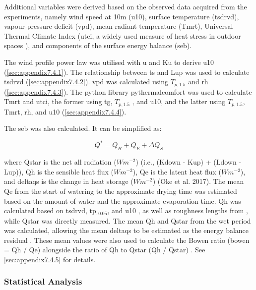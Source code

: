 \documentclass[final,3p,times,authoryear]{elsarticle}
\begin{document}
Additional variables were derived based on the observed data acquired from the
experiments, namely wind speed at 10m (\gls{u10}), surface temperature (\gls{tsdrvd}), vapour-pressure deficit (\gls{vpd}), mean radiant temperature (\gls{Tmrt}), Universal Thermal Climate Index (\gls{utci}, a widely used measure of heat stress in outdoor spaces \citep{Zare2018a}), and components of the surface energy balance (\gls{seb}).

The wind profile power law \citep{Manwell2010,Banuelos-Ruedas2010} was
utilised with \gls{u} and \gls{Ku}  to derive \gls{u10} (\ref{sec:appendix7.4.1}). The relationship between \gls{ts} and \gls{Lup} \citep{Oke2017} was used to calculate \gls{tsdrvd} (\ref{sec:appendix7.4.2}). \gls{vpd} was calculated using $T_{p,1.5}$ and \gls{rh} \citep{Allen1998,McMahon2013} (\ref{sec:appendix7.4.3}). The python library pythermalcomfort \citep{Tartarini2020} was used to calculate \gls{Tmrt} and \gls{utci}, the former using \gls{tg}, $T_{p,1.5}$ , and \gls{u10}, and the latter using $T_{p,1.5}$, \gls{Tmrt}, \gls{rh}, and \gls{u10} (\ref{sec:appendix7.4.4}).

The \gls{seb} was also calculated. It can be simplified as:

\begin{equation}
Q^{*} = Q_{H} + Q_{E} + \Delta Q_{S}
\label{eq:2.1} 
\end{equation}

where \gls{Qstar} is the net all radiation ($Wm^{-2}$) (i.e., (\gls{Kdown} - \gls{Kup}) + (\gls{Ldown} - \gls{Lup})), \gls{Qh} is the sensible heat flux ($Wm^{-2}$), \gls{Qe} is the latent heat flux ($Wm^{-2}$), and \gls{deltaqs} is the change in heat storage ($Wm^{-2}$) (Oke et al. 2017). The mean \gls{Qe} from the start of watering to the approximate drying time was estimated based on the amount of water and the approximate evaporation time. \gls{Qh} was calculated based on \gls{tsdrvd}, \gls{tp}$_{,0.05}$, and \gls{u10} \citep{Liu2007}, as well as roughness lengths from \cite{Kanda2007}, while \gls{Qstar} was directly measured. The mean \gls{Qh} and \gls{Qstar} from the wet period was calculated, allowing the mean \gls{deltaqs} to be estimated as the energy balance residual \citep{Oke2017}. These mean values were also used to calculate the Bowen ratio (\gls{bowen} = \gls{Qh} / \gls{Qe}) alongside the ratio of \gls{Qh} to \gls{Qstar} (\gls{Qh} / \gls{Qstar}) \citep{Oke2017}. See \ref{sec:appendix7.4.5} for details.


\subsubsection{Statistical Analysis}\label{sec:methods2.2.3}
\end{document}
